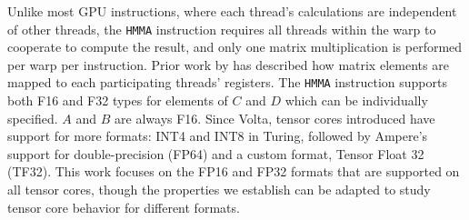 Unlike most GPU instructions, where each thread's calculations are independent of other threads, the \texttt{HMMA} instruction requires all threads within the warp to cooperate to compute the result, and only one matrix multiplication is performed per warp per instruction. Prior work by \citet{yan2020demystifying,fang2022towards} has described how matrix elements are mapped to each participating threads' registers.
The \texttt{HMMA} instruction supports both F16 and F32 types for elements of $C$ and $D$ which can be individually specified. $A$ and $B$ are always F16. Since Volta, tensor cores introduced have support for more formats: INT4 and INT8 in Turing, followed by Ampere's support for double-precision (FP64) and a custom format, Tensor Float 32 (TF32). This work focuses on the FP16 and FP32 formats that are supported on all tensor cores, though the properties we establish can be adapted to study tensor core behavior for different formats.
